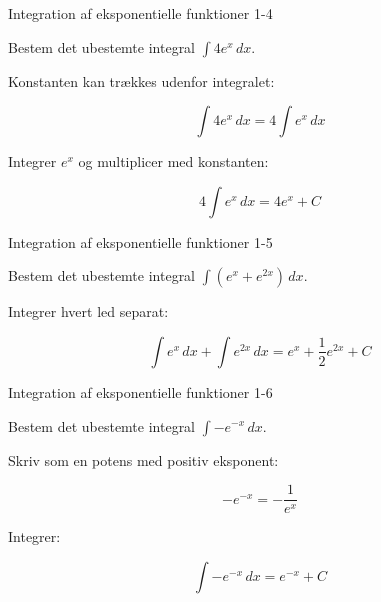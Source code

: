 \documentclass{article}
\begin{document}
\newpage

\begin{exercise}{Integration af eksponentielle funktioner 1-4}

Bestem det ubestemte integral $\int 4e^x \, dx$.


\hint

Konstanten kan trækkes udenfor integralet:

\hint
\[
\int 4e^x \, dx = 4 \int e^x \, dx
\]

\hint

Integrer $e^x$ og multiplicer med konstanten:

\hint
\[
4 \int e^x \, dx = 4e^x + C
\]

\end{exercise}

\newpage

\begin{exercise}{Integration af eksponentielle funktioner 1-5}

Bestem det ubestemte integral $\int (e^x + e^{2x}) \, dx$.


\hint

Integrer hvert led separat:

\hint
\[
\int e^x \, dx + \int e^{2x} \, dx = e^x + \frac{1}{2}e^{2x} + C
\]

\end{exercise}

\newpage

\begin{exercise}{Integration af eksponentielle funktioner 1-6}

Bestem det ubestemte integral $\int -e^{-x} \, dx$.


\hint

Skriv som en potens med positiv eksponent:

\hint
\[
-e^{-x} = -\frac{1}{e^x}
\]

\hint

Integrer:

\hint
\[
\int -e^{-x} \, dx = e^{-x} + C
\]

\end{exercise}
\end{document}
